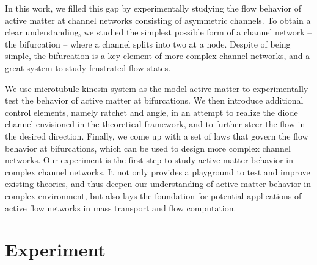\documentclass[%
10pt,
superscriptaddress,
twocolumn,
 amsmath,amssymb,
 aps,prx,
]{revtex4-2}
\begin{document}


In this work, we filled this gap by experimentally studying the flow behavior of active matter at channel networks consisting of asymmetric channels. 
To obtain a clear understanding, we studied the simplest possible form of a channel network -- the bifurcation -- where a channel splits into two at a node.
Despite of being simple, the bifurcation is a key element of more complex channel networks, and a great system to study frustrated flow states.



We use microtubule-kinesin system as the model active matter to experimentally test the behavior of active matter at bifurcations.
We then introduce additional control elements, namely ratchet and angle, in an attempt to realize the diode channel envisioned in the theoretical framework, and to further steer the flow in the desired direction.
Finally, we come up with a set of laws that govern the flow behavior at bifurcations, which can be used to design more complex channel networks.
Our experiment is the first step to study active matter behavior in complex channel networks.
It not only provides a playground to test and improve existing theories, and thus deepen our understanding of active matter behavior in complex environment, but also lays the foundation for potential applications of active flow networks in mass transport and flow computation. 



\section{Experiment}
\end{document}
